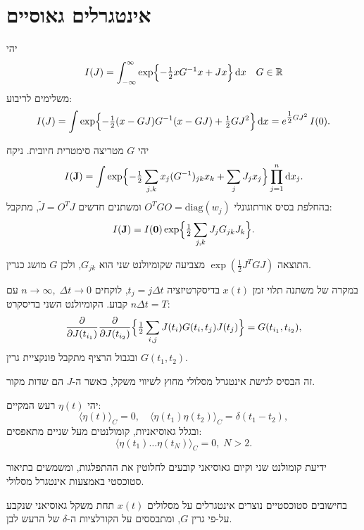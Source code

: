 \documentclass{tstextbook}
\begin{document}
\section{אינטגרלים גאוסיים}

\begin{proposition}
יהי
$$
I(J) = \int_{-\infty}^{\infty} \exp\Bigl\{-\tfrac12 x G^{-1} x + J x\Bigr\}\,\mathrm{d}x\quad G\in\mathbb{R}$$
משלימים לריבוע:
$$I(J) = \int \exp\Bigl\{-\tfrac12 (x - G J) G^{-1} (x - G J) + \tfrac12 G J^2 \Bigr\}\,\mathrm{d}x= e^{\tfrac12 G J^2}\,I(0).
$$

\end{proposition}
\begin{proposition}
יהי \(G\) מטריצה סימטרית חיובית. ניקח
$$I(\mathbf{J}) = \int \exp\Bigl\{ -\tfrac12 \sum_{j,k} x_j (G^{-1})_{jk} x_k + \sum_j J_j x_j \Bigr\} \prod_{j=1}^n \mathrm{d}x_j.
$$
בהחלפת בסיס אורתוגונלי \(O^T G O = \mathrm{diag}(w_j)\) ומשתנים חדשים \(\tilde J = O^T J\), מתקבל:
$$I(\mathbf{J}) = I(\mathbf{0}) \exp\Bigl\{\tfrac12 \sum_{j,k} J_j G_{jk} J_k \Bigr\}.
$$

\end{proposition}
\begin{remark}
התוצאה \(\exp(\tfrac12 J^T G J)\) מצביעה שקומיולנט שני הוא \(G_{jk}\), ולכן \(G\) מושג כגרין.

\end{remark}
\begin{proposition}
במקרה של משתנה תלוי זמן \(x(t)\) בדיסקרטיזציה \(t_j = j\Delta t\), לוקחים \(n\to\infty,\;\Delta t\to0\) עם \(n\Delta t=T\) קבוע. הקומיולנט השני בדיסקרט:
$$\frac{\partial}{\partial J(t_{i_1})}\frac{\partial}{\partial J(t_{i_2})} \Bigl\{\tfrac12 \sum_{i,j} J(t_i) G(t_i, t_j) J(t_j)\Bigr\}= G(t_{i_1},t_{i_2}),
$$
ובגבול הרציף מתקבל פונקציית גרין \(G(t_1,t_2)\).

\end{proposition}
\begin{remark}
זה הבסיס לגישת אינטגרל מסלולי מחוץ לשיווי משקל, כאשר ה-\(J\) הם שדות מקור.

\end{remark}
\begin{definition}
יהי \(\eta(t)\) רעש המקיים:
$$\langle \eta(t)\rangle_C=0,\quad \langle \eta(t_1)\eta(t_2)\rangle_C = \delta(t_1-t_2),
$$
ובגלל גאוסיאניות, קומולנטים מעל שניים מתאפסים:
$$\langle \eta(t_1)\dots \eta(t_N)\rangle_C = 0,\; N>2.
$$

\end{definition}
\begin{remark}
ידיעת קומולנט שני וקיום גאוסיאני קובעים לחלוטין את ההתפלגות, ומשמשים בתיאור סטוכסטי באמצעות אינטגרל מסלולי.

\end{remark}
\begin{remark}
בחישובים סטוכסטיים נוצרים אינטגרלים על מסלולים \(x(t)\) תחת משקל גאוסיאני שנקבע על-פי גרין \(G\), ומתבססים על הקורלציות ה-\(\delta\) של הרעש לבן.

\end{remark}
\end{document}
